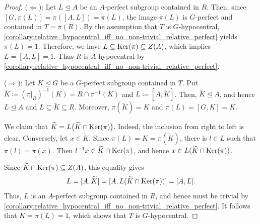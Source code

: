 \begin{proof}
($\Leftarrow$): Let $L\trianglelefteq A$ be an $A$-perfect subgroup contained in $R$. Then, since $[G,\pi(L)]=\pi([A,L])=\pi(L)$, the image $\pi(L)$ is $G$-perfect and contained in $T=\pi(R)$. By the assumption that $T$ is $G$-hypocentral, \cref{corollary:relative_hypocentral_iff_no_non-trivial_relative_perfect} yields $\pi(L)=1$. Therefore, we have $L\subseteq \operatorname{Ker}(\pi) \subseteq Z(A)$, which implies $L=[A,L]=1$. Thus $R$ is $A$-hypocentral by \cref{corollary:relative_hypocentral_iff_no_non-trivial_relative_perfect}.

($\Rightarrow$): Let $K\trianglelefteq G$ be a $G$-perfect subgroup contained in $T$. Put $\widetilde{K}\coloneqq(\pi\rvert_R)^{-1}(K) =R\cap\pi^{-1}(K)$ and $L\coloneqq[A,\widetilde{K}]$. Then, $\widetilde{K}\trianglelefteq A$, and hence $L\trianglelefteq A$ and $L\subseteq\widetilde{K}\subseteq R$. Moreover, $\pi(\widetilde{K})=K$ and $\pi(L)=[G,K]=K$.

We claim that $\widetilde{K} = L\bigl(\widetilde{K}\cap\operatorname{Ker}(\pi)\bigr)$. Indeed, the inclusion from right to left is clear. Conversely, let $x\in\widetilde{K}$. Since $\pi(L)=K=\pi(\widetilde{K})$, there is $l\in L$ such that $\pi(l)=\pi(x)$. Then $l^{-1}x\in\widetilde{K}\cap\operatorname{Ker}(\pi)$, and hence $x\in L(\widetilde{K}\cap\operatorname{Ker}(\pi))$.

Since $\widetilde{K}\cap\operatorname{Ker}(\pi)\subseteq Z(A)$, this equality gives
\[ L = [A,\widetilde K] = [A,L(\widetilde K\cap\operatorname{Ker}(\pi))] = [A,L]. \]
Thus, $L$ is an $A$-perfect subgroup contained in $R$, and hence must be trivial by \cref{corollary:relative_hypocentral_iff_no_non-trivial_relative_perfect}. It follows that $K=\pi(L)=1$, which shows that $T$ is $G$-hypocentral.
\end{proof}


